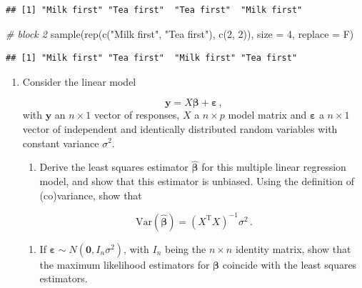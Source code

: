 \documentclass[
]{book}
\newenvironment{Shaded}{\begin{snugshade}}{\end{snugshade}}
\newcommand{\AttributeTok}[1]{\textcolor[rgb]{0.77,0.63,0.00}{#1}}
\newcommand{\CommentTok}[1]{\textcolor[rgb]{0.56,0.35,0.01}{\textit{#1}}}
\newcommand{\DecValTok}[1]{\textcolor[rgb]{0.00,0.00,0.81}{#1}}
\newcommand{\FunctionTok}[1]{\textcolor[rgb]{0.00,0.00,0.00}{#1}}
\newcommand{\NormalTok}[1]{#1}
\newcommand{\StringTok}[1]{\textcolor[rgb]{0.31,0.60,0.02}{#1}}
\providecommand{\tightlist}{%
  \setlength{\itemsep}{0pt}\setlength{\parskip}{0pt}}
\theoremstyle{definition}
\theoremstyle{definition}
\theoremstyle{definition}
\theoremstyle{definition}
\theoremstyle{remark}
\begin{document}
\begin{enumerate}
\begin{verbatim}
## [1] "Milk first" "Tea first"  "Tea first"  "Milk first"
\end{verbatim}

\begin{Shaded}
\begin{Highlighting}[]
\CommentTok{\# block 2}
\FunctionTok{sample}\NormalTok{(}\FunctionTok{rep}\NormalTok{(}\FunctionTok{c}\NormalTok{(}\StringTok{"Milk first"}\NormalTok{, }\StringTok{"Tea first"}\NormalTok{), }\FunctionTok{c}\NormalTok{(}\DecValTok{2}\NormalTok{, }\DecValTok{2}\NormalTok{)), }\AttributeTok{size =} \DecValTok{4}\NormalTok{, }\AttributeTok{replace =}\NormalTok{ F)}
\end{Highlighting}
\end{Shaded}

\begin{verbatim}
## [1] "Milk first" "Tea first"  "Milk first" "Tea first"
\end{verbatim}
\end{enumerate}

\begin{enumerate}
\def\labelenumi{\arabic{enumi}.}
\setcounter{enumi}{1}
\item
  Consider the linear model

  \[\boldsymbol{y}= X\boldsymbol{\beta}+ \boldsymbol{\varepsilon}\,,\]
  with \(\boldsymbol{y}\) an \(n\times 1\) vector of responses, \(X\) a \(n\times p\) model matrix and \(\boldsymbol{\varepsilon}\) a \(n\times 1\) vector of independent and identically distributed random variables with constant variance \(\sigma^2\).

  \begin{enumerate}
  \def\labelenumii{\alph{enumii}.}
  \tightlist
  \item
    Derive the least squares estimator \(\hat{\boldsymbol{\beta}}\) for this multiple linear regression model, and show that this estimator is unbiased. Using the definition of (co)variance, show that
  \end{enumerate}

  \[\mbox{Var}(\hat{\boldsymbol{\beta}}) = \left(X^{\mathrm{T}}X\right)^{-1}\sigma^2\,.\]

  \begin{enumerate}
  \def\labelenumii{\alph{enumii}.}
  \setcounter{enumii}{1}
  \tightlist
  \item
    If \(\boldsymbol{\varepsilon}\sim N (\boldsymbol{0},I_n\sigma^2)\), with \(I_n\) being the \(n\times n\) identity matrix, show that the maximum likelihood estimators for \(\boldsymbol{\beta}\) coincide with the least squares estimators.
  \end{enumerate}
\end{enumerate}
\end{document}

